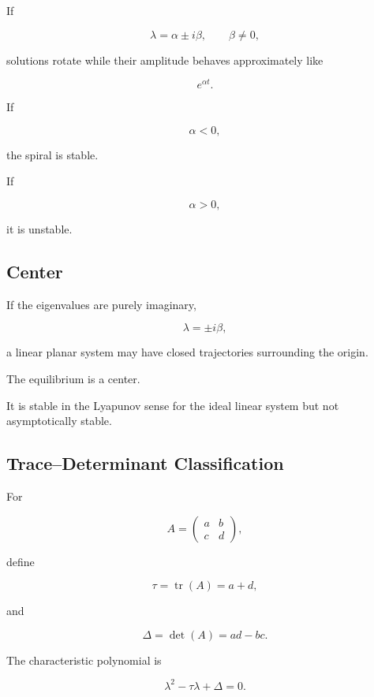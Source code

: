 If

\[
\boxed{
\lambda
=
\alpha
\pm
i\beta,
\qquad
\beta\neq0,
}
\]

solutions rotate while their amplitude behaves approximately like

\[
e^{\alpha t}.
\]

If

\[
\boxed{
\alpha<0,
}
\]

the spiral is stable.

If

\[
\boxed{
\alpha>0,
}
\]

it is unstable.

\subsection{Center}
\label{subsec:center-linear-system}

If the eigenvalues are purely imaginary,

\[
\boxed{
\lambda
=
\pm i\beta,
}
\]

a linear planar system may have closed trajectories surrounding the
origin.

The equilibrium is a center.

It is stable in the Lyapunov sense for the ideal linear system but not
asymptotically stable.

\subsection{Trace--Determinant Classification}
\label{subsec:trace-determinant-classification}

For

\[
A
=
\begin{pmatrix}
a&b\\
c&d
\end{pmatrix},
\]

define

\[
\boxed{
\tau
=
\operatorname{tr}(A)
=
a+d,
}
\]

and

\[
\boxed{
\Delta
=
\det(A)
=
ad-bc.
}
\]

The characteristic polynomial is

\[
\boxed{
\lambda^2
-
\tau\lambda
+
\Delta
=
0.
}
\]

